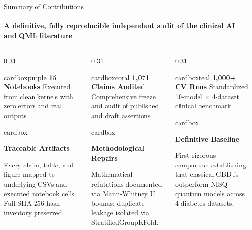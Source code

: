 \documentclass[aspectratio=169, 10pt]{beamer}
\newcommand{\cardbox}[3]{%
  \begin{beamercolorbox}[wd=\linewidth,rounded=true,sep=2.5pt]{cardbox}%
    {\bfseries\scriptsize\color{#1}#2\par}\vspace*{1pt}%
    {\footnotesize #3}%
  \end{beamercolorbox}%
}
\newcommand{\statbox}[3]{%
  \begin{beamercolorbox}[wd=\linewidth,rounded=true,center,sep=3pt]{#1}%
    {\Large\bfseries #2}\vskip 1pt%
    {\scriptsize #3}%
  \end{beamercolorbox}%
}
\begin{document}
\begin{frame}{Summary of Contributions}
  \framesubtitle{A definitive, fully reproducible independent audit of the clinical AI and QML literature}

  \begin{columns}[T]
    \begin{column}{0.31\textwidth}
      \statbox{cardboxpurple}{\color{DeepPurple} 15 Notebooks}{Executed from clean kernels with zero errors and real outputs}
      \vspace*{3pt}
      \cardbox{CardBg}{Traceable Artifacts}{
        \scriptsize Every claim, table, and figure mapped to underlying CSVs and executed notebook cells. Full SHA-256 hash inventory preserved.
      }
    \end{column}

    \begin{column}{0.31\textwidth}
      \statbox{cardboxcoral}{\color{CoralRed} 1,071 Claims Audited}{Comprehensive freeze and audit of published and draft assertions}
      \vspace*{3pt}
      \cardbox{CardBg}{Methodological Repairs}{
        \scriptsize Mathematical refutations documented via Mann-Whitney U bounds; duplicate leakage isolated via StratifiedGroupKFold.
      }
    \end{column}

    \begin{column}{0.31\textwidth}
      \statbox{cardboxteal}{\color{TealAccent} 1,000+ CV Runs}{Standardized 10-model $\times$ 4-dataset clinical benchmark}
      \vspace*{3pt}
      \cardbox{CardBg}{Definitive Baseline}{
        \scriptsize First rigorous comparison establishing that classical GBDTs outperform NISQ quantum models across 4 diabetes datasets.
      }
    \end{column}
  \end{columns}
\end{frame}
\end{document}
